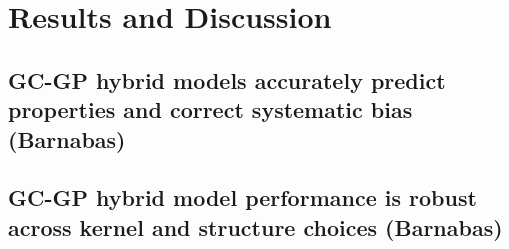 \documentclass[journal=jacsat,manuscript=article]{achemso}
\begin{document}
\section{Results and Discussion}

\subsection{GC-GP hybrid models accurately predict properties and correct systematic bias (Barnabas)}

\subsection{GC-GP hybrid model performance is robust across kernel and structure choices (Barnabas) }


%
\end{document}
